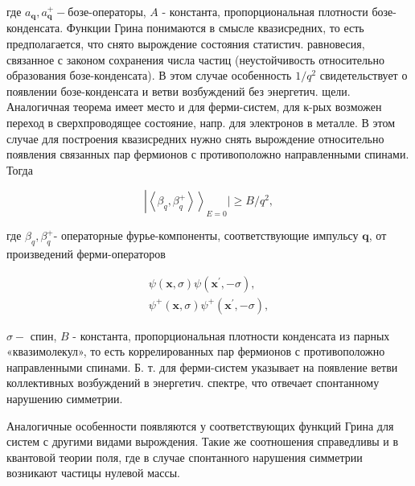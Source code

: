 \documentclass[10pt]{article}
\begin{document}
где $a_{\boldsymbol{q}}, a_{\boldsymbol{q}}^{+}-$бозе-операторы, $A$ - константа, пропорциональная плотности бозе-конденсата. Функции Грина понимаются в смысле квазисредних, то есть предполагается, что снято вырождение состояния статистич. равновесия, связанное с законом сохранения числа частиц (неустойчивость относительно образования бозе-конденсата). В этом случае особенность $1 / q^{2}$ свидетельствует о появлении бозе-конденсата и ветви возбуждений без энергетич. щели. Аналогичная теорема имеет место и для ферми-систем, для к-рых возможен переход в сверхпроводящее состояние, напр. для электронов в металле. В этом случае для построения квазисредних нужно снять вырождение относительно появления связанных пар фермионов с противоположно направленными спинами. Тогда



\[

\left|\left\langle\beta_{q}, \beta_{q}^{+}\right\rangle\right\rangle_{E=0} \mid \geqslant B / q^{2},

\]



где $\beta_{q}, \beta_{q}^{+}$- операторные фурье-компоненты, соответствующие импульсу $\boldsymbol{q}$, от произведений ферми-операторов



\[

\begin{gathered}

\psi(\boldsymbol{x}, \sigma) \psi\left(\boldsymbol{x}^{\prime},-\sigma\right), \\

\psi^{+}(\boldsymbol{x}, \sigma) \psi^{+}\left(\boldsymbol{x}^{\prime},-\sigma\right),

\end{gathered}

\]



$\sigma-$ спин, $B$ - константа, пропорциональная плотности конденсата из парных «квазимолекул», то есть коррелированных пар фермионов с противоположно направленными спинами. Б. т. для ферми-систем указывает на появление ветви коллективных возбуждений в энергетич. спектре, что отвечает спонтанному нарушению симметрии.



Аналогичные особенности появляются у соответствующих функций Грина для систем с другими видами вырождения. Такие же соотношения справедливы и в квантовой теории поля, где в случае спонтанного нарушения симметрии возникают частицы нулевой массы.
\end{document}
